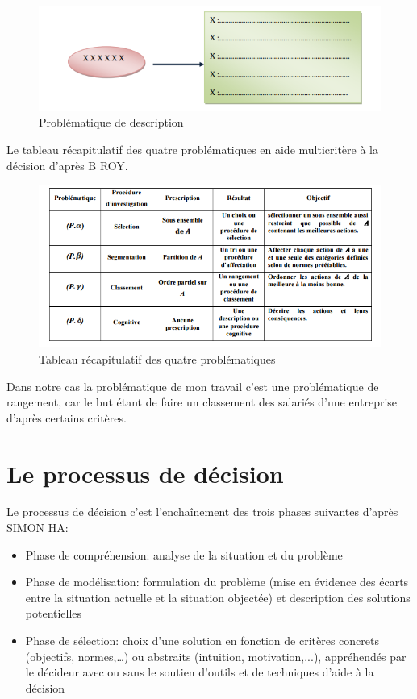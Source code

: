 \begin{itemize}
\begin{figure}[!h]
\begin{center}
\includegraphics{aide_multicrit_decision/prob_de_descr.png}
\end{center}
\caption{Problématique de description}
\end{figure}
\end{itemize}

Le tableau récapitulatif des quatre problématiques en aide multicritère à la décision d’après B ROY.

\begin{figure}[!h]
\begin{center}
\includegraphics{aide_multicrit_decision/tabl_recap.png}
\end{center}
\caption{Tableau récapitulatif des quatre problématiques}
\end{figure}

Dans notre cas la problématique de mon travail c’est une problématique de rangement, car le but étant de faire un classement des salariés d’une entreprise d’après certains critères.

\newpage
\section{Le processus de décision}
Le processus de décision c’est l’enchaînement des trois phases suivantes d’après SIMON HA: 
\begin{itemize}
\item Phase de compréhension: analyse de la situation et du problème  
\item Phase de modélisation: formulation du problème (mise en évidence des écarts entre la situation actuelle et la situation objectée) et description des solutions potentielles 
\item Phase de sélection: choix d’une solution en fonction de critères concrets (objectifs, normes,…) ou abstraits (intuition, motivation,...), appréhendés par le décideur avec ou sans le soutien d’outils et de techniques d’aide à la décision
\end{itemize}
	
